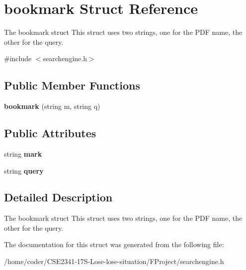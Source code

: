 \section{bookmark Struct Reference}
\label{structbookmark}


The bookmark struct This struct uses two strings, one for the P\+DF name, the other for the query.  




{\ttfamily \#include $<$searchengine.\+h$>$}

\subsection*{Public Member Functions}
\begin{DoxyCompactItemize}
\item 
{\bfseries bookmark} (string m, string q)\label{structbookmark_ad1783bc7b182c5af9e42411cac3cc08f}

\end{DoxyCompactItemize}
\subsection*{Public Attributes}
\begin{DoxyCompactItemize}
\item 
string {\bfseries mark}\label{structbookmark_a872f359ce12f82e6d906ae951840f5ac}

\item 
string {\bfseries query}\label{structbookmark_abc6d931aa6d6d2c14e906277fc5bdd77}

\end{DoxyCompactItemize}


\subsection{Detailed Description}
The bookmark struct This struct uses two strings, one for the P\+DF name, the other for the query. 

The documentation for this struct was generated from the following file\+:\begin{DoxyCompactItemize}
\item 
/home/coder/\+C\+S\+E2341-\/17\+S-\/\+Lose-\/lose-\/situation/\+F\+Project/searchengine.\+h\end{DoxyCompactItemize}
